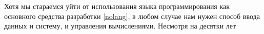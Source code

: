 \clearpage
{}

Хотя мы стараемся уйти от использования языка программирования как основного
средства разработки \ref{nolang}, в любом случае нам нужен способ ввода данных и
систему, и управления вычислениями. Несмотря на десятки лет  

